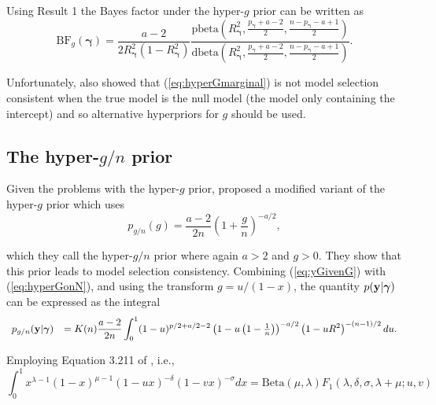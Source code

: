 \documentclass[12pt]{article}
\def\vectorfontone{\bf}
\def\vectorfonttwo{\boldsymbol}
\def\vy{{\vectorfontone y}}                      %
\def\vgamma{{\vectorfonttwo \gamma}}             %
\def\ds{\displaystyle}
\begin{document}
\noindent Using Result 1 the Bayes factor under the hyper-$g$ prior can be written as
\begin{equation}\label{eq:hyperGmarginal2}
	\ds \mbox{BF}_{g}(\vgamma) 
	=  
	\frac{a - 2}{2 R_\vgamma^2(1 - R_\vgamma^2)} 
	\frac{\mbox{pbeta}\left(R_\vgamma^2,\tfrac{p_\vgamma + a - 2}{2},\tfrac{n-p_\vgamma - a+1}{2}\right)}{
		\mbox{dbeta}\left(R_\vgamma^2,\tfrac{p_\vgamma + a - 2}{2},\tfrac{n-p_\vgamma - a+1}{2}\right)}.
\end{equation}


\noindent 
Unfortunately, \cite{Liang2008} also showed that
(\ref{eq:hyperGmarginal}) is not model selection consistent when the
true model is the null model (the model only containing the intercept) and so alternative hyperpriors for $g$ should be used.




\subsection{The hyper-$g/n$ prior}

Given the problems with the hyper-$g$ prior, \cite{Liang2008} 
proposed a modified variant of the hyper-$g$ prior which uses
\begin{equation}\label{eq:hyperGonN}
\ds p_{g/n}(g) = \frac{a - 2}{2n}\left( 1 + \frac{g}{n} \right)^{-a/2},
\end{equation}

\noindent which they call the hyper-$g/n$ prior where again $a>2$ and $g>0$.
They show that this prior leads to model selection consistency.
Combining (\ref{eq:yGivenG}) with (\ref{eq:hyperGonN}), and using the transform
$g = u/(1 - x)$, the quantity $p(\vy|\vgamma)$ 
can be expressed as the integral
\begin{equation}\label{eq:hyperGonNmarginalIntegral}
\begin{array}{rl}
p_{g/n}(\vy|\vgamma) 
& \ds = K(n) \frac{a - 2}{2n}  \int_0^1 
(1 - u)^{p/2 + a/2 - 2  } \left(  1 - u \left(1  -  \tfrac{1}{n} \right) \right)^{-a/2} \left(  1 - u R^2\right)^{-(n-1)/2} du.
\end{array} 
\end{equation}

\noindent  Employing 
Equation 3.211 of \cite{Gradshteyn2007}, i.e.,
$$
\int_0^1 x^{\lambda-1}(1 - x)^{\mu - 1}(1 - u x)^{-\delta}(1 - vx)^{-\sigma} dx = \mbox{Beta}(\mu,\lambda) F_1(\lambda,\delta,\sigma,\lambda+\mu;u,v) 
$$
\end{document}

